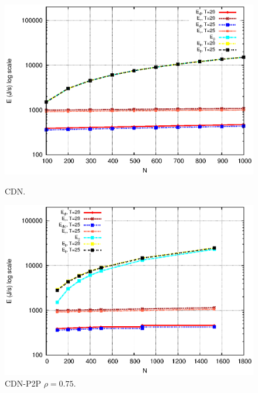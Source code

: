 \documentclass[conference]{IEEEtran}
\begin{document}
\begin{figure}[htp!]
\centering
\begin{minipage}[b]{0.4\linewidth}
	\includegraphics[scale=0.5]{graphs/cdn.eps}
	\caption{CDN.}
	\label{fig:4-0}
\end{minipage}
\hfill
\begin{minipage}[b]{0.4\linewidth}
	\includegraphics[scale=0.5]{graphs/cdnp2p-3.eps}
	\caption{CDN-P2P $\rho=0.75$.}
	\label{fig:4-3}
\end{minipage}
\label{fig:main}
\end{figure}
\end{document}
